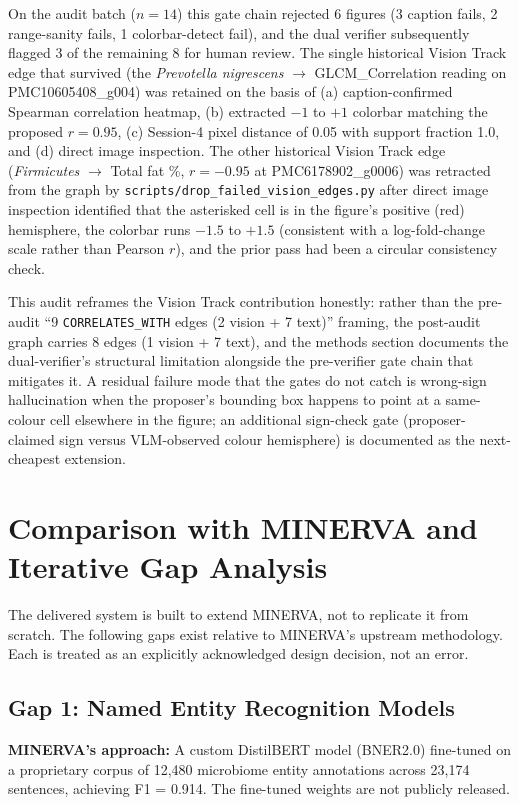 \documentclass[12pt, letterpaper]{article}
\begin{document}
On the audit batch ($n = 14$) this gate chain rejected 6 figures (3 caption fails, 2 range-sanity fails, 1 colorbar-detect fail), and the dual verifier subsequently flagged 3 of the remaining 8 for human review. The single historical Vision Track edge that survived (the \textit{Prevotella nigrescens} $\to$ GLCM\_Correlation reading on PMC10605408\_g004) was retained on the basis of (a) caption-confirmed Spearman correlation heatmap, (b) extracted $-1$ to $+1$ colorbar matching the proposed $r = 0.95$, (c) Session-4 pixel distance of 0.05 with support fraction 1.0, and (d) direct image inspection. The other historical Vision Track edge (\textit{Firmicutes} $\to$ Total fat \%, $r = -0.95$ at PMC6178902\_g0006) was retracted from the graph by \texttt{scripts/drop\_failed\_vision\_edges.py} after direct image inspection identified that the asterisked cell is in the figure's positive (red) hemisphere, the colorbar runs $-1.5$ to $+1.5$ (consistent with a log-fold-change scale rather than Pearson $r$), and the prior pass had been a circular consistency check.

This audit reframes the Vision Track contribution honestly: rather than the pre-audit ``9 \texttt{CORRELATES\_WITH} edges (2 vision + 7 text)'' framing, the post-audit graph carries 8 edges (1 vision + 7 text), and the methods section documents the dual-verifier's structural limitation alongside the pre-verifier gate chain that mitigates it. A residual failure mode that the gates do not catch is wrong-sign hallucination when the proposer's bounding box happens to point at a same-colour cell elsewhere in the figure; an additional sign-check gate (proposer-claimed sign versus VLM-observed colour hemisphere) is documented as the next-cheapest extension.

\section{Comparison with MINERVA and Iterative Gap Analysis}

The delivered system is built to extend MINERVA, not to replicate it from scratch. The following gaps exist relative to MINERVA's upstream methodology. Each is treated as an explicitly acknowledged design decision, not an error.

\subsection{Gap 1: Named Entity Recognition Models}

\textbf{MINERVA's approach:} A custom DistilBERT model (BNER2.0) fine-tuned on a proprietary corpus of 12,480 microbiome entity annotations across 23,174 sentences, achieving F1 = 0.914. The fine-tuned weights are not publicly released.
\end{document}
